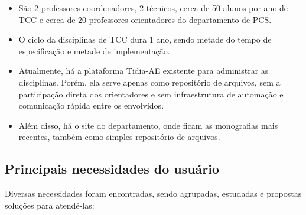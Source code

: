 \begin{itemize}
    \item São 2 professores coordenadores, 2 técnicos, cerca de 50 alunos por ano de TCC e cerca de 20 professores orientadores do departamento de PCS.
    \item O ciclo da disciplinas de TCC dura 1 ano, sendo metade do tempo de especificação e metade de implementação.
    \item Atualmente, há a plataforma Tidia-AE existente para administrar as disciplinas. Porém, ela serve apenas como repositório de arquivos, sem a participação direta dos orientadores e sem infraestrutura de automação e comunicação rápida entre os envolvidos.
    \item Além disso, há o site do departamento, onde ficam as monografias mais recentes, também como simples repositório de arquivos.
\end{itemize}

\subsection{Principais necessidades do usuário}
Diversas necessidades foram encontradas, sendo agrupadas, estudadas e propostas soluções para atendê-las:

